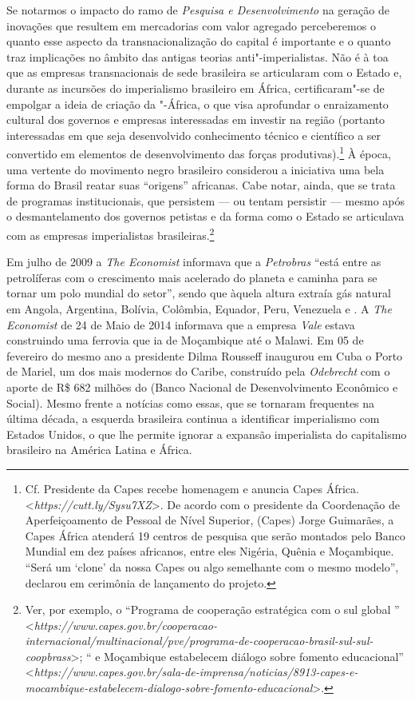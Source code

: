 Se notarmos o impacto do ramo de \emph{Pesquisa e Desenvolvimento} na
geração de inovações que resultem em mercadorias com valor agregado
perceberemos o quanto esse aspecto da transnacionalização do capital é
importante e o quanto traz implicações no âmbito das antigas teorias
anti"-imperialistas. Não é à toa que as empresas transnacionais de sede
brasileira se articularam com o Estado e, durante as incursões do
imperialismo brasileiro em África, certificaram"-se de empolgar a ideia
de criação da "-África, o que visa aprofundar o enraizamento
cultural dos governos e empresas interessadas em investir na região
(portanto interessadas em que seja desenvolvido conhecimento técnico e
científico a ser convertido em elementos de desenvolvimento das forças
produtivas).\footnote{Cf. Presidente da Capes recebe homenagem e anuncia
  Capes África.
  \textless{}\emph{https://cutt.ly/Sysu7XZ}\textgreater{}.
  De acordo com o presidente da Coordenação de Aperfeiçoamento de
  Pessoal de Nível Superior, (Capes) Jorge Guimarães, a Capes África
  atenderá 19 centros de pesquisa que serão montados pelo Banco Mundial
  em dez países africanos, entre eles Nigéria, Quênia e Moçambique.
  ``Será um `clone' da nossa Capes ou algo semelhante com o mesmo
  modelo'', declarou em cerimônia de lançamento do projeto.} À época,
uma vertente do movimento negro brasileiro considerou a iniciativa uma
bela forma do Brasil reatar suas ``origens'' africanas. Cabe notar,
ainda, que se trata de programas institucionais, que persistem --- ou
tentam persistir --- mesmo após o desmantelamento dos governos petistas e
da forma como o Estado se articulava com as empresas imperialistas
brasileiras.\footnote{Ver, por exemplo, o ``Programa de cooperação
  estratégica com o sul global ''
  \textless{}\emph{https://www.capes.gov.br/cooperacao-internacional/multinacional/pve/programa-de-cooperacao-brasil-sul-sul-coopbrass}\textgreater{};
  `` e Moçambique estabelecem diálogo sobre fomento educacional''
  \textless{}\emph{https://www.capes.gov.br/sala-de-imprensa/noticias/8913-capes-e-mocambique-estabelecem-dialogo-sobre-fomento-educacional}\textgreater{}.}

Em julho de 2009 a \emph{The Economist} informava que a \emph{Petrobras}
``está entre as petrolíferas com o crescimento mais acelerado do planeta
e caminha para se tornar um polo mundial do setor'', sendo que àquela
altura extraía gás natural em Angola, Argentina, Bolívia, Colômbia,
Equador, Peru, Venezuela e . A \emph{The Economist} de 24 de Maio de
2014 informava que a empresa \emph{Vale} estava construindo uma ferrovia
que ia de Moçambique até o Malawi. Em 05 de fevereiro do mesmo ano a
presidente Dilma Rousseff inaugurou em Cuba o Porto de Mariel, um dos
mais modernos do Caribe, construído pela \emph{Odebrecht} com o aporte
de R\$ 682 milhões do  (Banco Nacional de Desenvolvimento Econômico
e Social). Mesmo frente a notícias como essas, que se tornaram
frequentes na última década, a esquerda brasileira continua a
identificar imperialismo com Estados Unidos, o que lhe permite ignorar a
expansão imperialista do capitalismo brasileiro na América Latina e
África.

